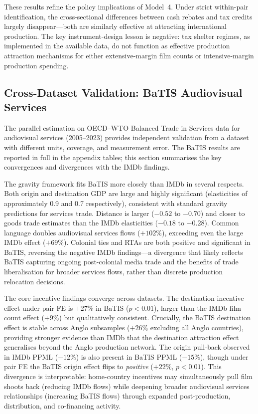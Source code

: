 These results refine the policy implications of Model~4. Under strict within-pair identification, the cross-sectional differences between cash rebates and tax credits largely disappear---both are similarly effective at attracting international production. The key instrument-design lesson is negative: tax shelter regimes, as implemented in the available data, do not function as effective production attraction mechanisms for either extensive-margin film counts or intensive-margin production spending.

\subsection{Cross-Dataset Validation: BaTIS Audiovisual Services}
\label{sec:batis_results}

The parallel estimation on OECD--WTO Balanced Trade in Services data for audiovisual services (2005--2023) provides independent validation from a dataset with different units, coverage, and measurement error. The BaTIS results are reported in full in the appendix tables; this section summarises the key convergences and divergences with the IMDb findings.

The gravity framework fits BaTIS more closely than IMDb in several respects. Both origin and destination GDP are large and highly significant (elasticities of approximately 0.9 and 0.7 respectively), consistent with standard gravity predictions for services trade. Distance is larger ($-0.52$ to $-0.70$) and closer to goods trade estimates than the IMDb elasticities ($-0.18$ to $-0.28$). Common language doubles audiovisual services flows ($+102\%$), exceeding even the large IMDb effect ($+69\%$). Colonial ties and RTAs are both positive and significant in BaTIS, reversing the negative IMDb findings---a divergence that likely reflects BaTIS capturing ongoing post-colonial media trade and the benefits of trade liberalisation for broader services flows, rather than discrete production relocation decisions.

The core incentive findings converge across datasets. The destination incentive effect under pair FE is $+27\%$ in BaTIS ($p < 0.01$), larger than the IMDb film count effect ($+9\%$) but qualitatively consistent. Crucially, the BaTIS destination effect is stable across Anglo subsamples ($+26\%$ excluding all Anglo countries), providing stronger evidence than IMDb that the destination attraction effect generalises beyond the Anglo production network. The origin pull-back observed in IMDb PPML ($-12\%$) is also present in BaTIS PPML ($-15\%$), though under pair FE the BaTIS origin effect flips to \textit{positive} ($+22\%$, $p < 0.01$). This divergence is interpretable: home-country incentives may simultaneously pull film shoots back (reducing IMDb flows) while deepening broader audiovisual services relationships (increasing BaTIS flows) through expanded post-production, distribution, and co-financing activity.

